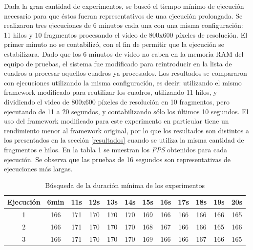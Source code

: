 Dada la gran cantidad de experimentos, se buscó el tiempo mínimo de ejecución
necesario para que éstos fueran representativos de una ejecución prolongada. Se
realizaron tres ejecuciones de 6 minutos cada una con una misma configuración:
11 hilos y 10 fragmentos procesando el video de 800x600 píxeles de resolución.
El primer minuto no se contabilizó, con el fin de permitir que la ejecución se
estabilizara. Dado que los 6 minutos de video no caben en la memoria RAM del
equipo de pruebas, el sistema fue modificado para reintroducir en la lista de
cuadros a procesar aquellos cuadros ya procesados. Los resultados se compararon
con ejecuciones utilizando la misma configuración, es decir: utilizando el mismo
framework modificado para reutilizar los cuadros, utilizando 11 hilos, y
dividiendo el video de 800x600 píxeles de resolución en 10 fragmentos, pero
ejecutando de 11 a 20 segundos, y contabilizando sólo los últimos 10 segundos.
El uso del framework modificado para este experimento en particular tiene un
rendimiento menor al framework original, por lo que los resultados son distintos
a los presentados en la sección \ref{resultados} cuando se utiliza la misma
cantidad de fragmentos e hilos. En la tabla 1 se muestran los \emph{FPS}
obtenidos para cada ejecución. Se observa que las pruebas de 16 segundos son
representativas de ejecuciones más largas.

\begin{table}[h]
	\centering

	\caption{Búsqueda de la duración mínima de los experimentos}

	\begin{tabular}{c||c|c|c|c|c|c|c|c|c|c|c}

		Ejecución&6min&11s&12s&13s&14s&15s&16s&17s&18s&19s&20s\\

		\hline
		\hline

		1&166& 171& 170& 170& 170& 169& 166& 166& 166& 166& 165\\

		\hline

		2&166& 171& 170& 170& 170& 168& 167& 166& 166& 165& 166\\

		\hline

		3&166& 171& 170& 170& 170& 169& 166& 166& 167& 166& 165

	\end{tabular}

\label{tabla}

\end{table}

